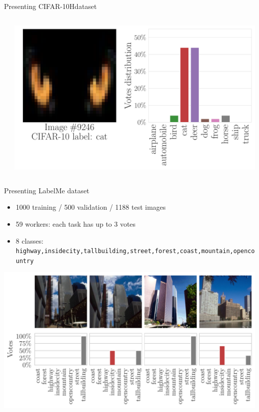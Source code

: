 \begin{frame}{Presenting CIFAR-10Hdataset}{}
\begin{columns}
\begin{column}{.33\textwidth}
        \end{column}
        \begin{column}{.33\textwidth}

            \includegraphics[width=\textwidth]{../chapters/images/image_n_hist9246_paper.pdf}

        \end{column}


    \end{columns}
\end{frame}
\begin{frame}{Presenting LabelMe dataset}{}
\begin{itemize}
    \item 1000 training / 500 validation / 1188 test images
    \item 59 workers: each task has up to 3 votes
    \item 8 classes: \texttt{highway,insidecity,tallbuilding,street,forest,coast,mountain,opencountry}
\end{itemize}

\pause

\centering
\includegraphics[width=.85\textwidth]{../chapters/images/tallbuilding_and_distrib.pdf}

\end{frame}

